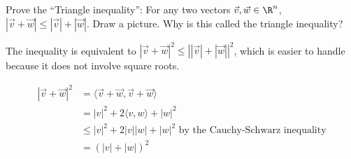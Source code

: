 \documentclass{ximera}
\begin{document}
Prove the ``Triangle inequality'':  For any two vectors $\vec{v},\vec{w} \in \R^n$, $|\vec{v}+\vec{w}|\leq |\vec{v}|+|\vec{w}|$.  Draw a picture.  Why is this called the triangle inequality?


\begin{free-response}
  The inequality is equivalent to $|\vec{v}+\vec{w}|^2\leq \left||\vec{v}|+|\vec{w}|\right|^2$, which is easier to handle because it does not involve square roots.
  
  \begin{align*}
    |\vec{v}+\vec{w}|^2  &= \langle \vec{v}+\vec{w},\vec{v}+\vec{w}\rangle\\
    &= |v|^2+2\langle v,w\rangle + |w|^2\\
    &\leq |v|^2+2|v||w|+|w|^2 \text{ by the Cauchy-Schwarz inequality}\\
    &= (|v|+|w|)^2
  \end{align*}
\end{free-response} 	
    
\end{document}
